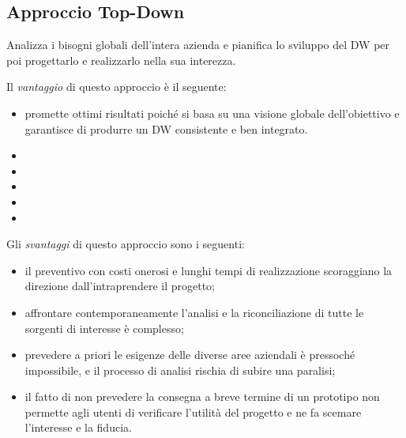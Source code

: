 \documentclass[a4paper, notitlepage, 9pt]{extreport}
\begin{document}
\subsection*{Approccio Top-Down}
Analizza i bisogni globali dell’intera azienda e pianifica lo sviluppo del DW per poi progettarlo e realizzarlo nella sua interezza.
\begin{multicols}{2}
	\noindent
	Il \textit{vantaggio} di questo approccio è il seguente:
	\begin{itemize}
		\item promette ottimi risultati poiché si basa su una visione globale dell’obiettivo e garantisce di produrre un DW consistente e ben integrato.
		\item 
		\item 
		\item 
		\item 
		\item 
	\end{itemize}
	\columnbreak
	Gli \textit{svantaggi} di questo approccio sono i seguenti:
	\begin{itemize}
		\item il preventivo con costi onerosi e lunghi tempi di realizzazione scoraggiano la direzione dall’intraprendere il progetto;
		\item affrontare contemporaneamente l’analisi e la riconciliazione di tutte le sorgenti di interesse è complesso;
		\item prevedere a priori le esigenze delle diverse aree aziendali è pressoché impossibile, e il processo di analisi rischia di subire una paralisi;
		\item il fatto di non prevedere la consegna a breve termine di un prototipo non permette agli utenti di verificare l’utilità del progetto e ne fa scemare l’interesse e la fiducia.
	\end{itemize}
\end{multicols}
\end{document}
